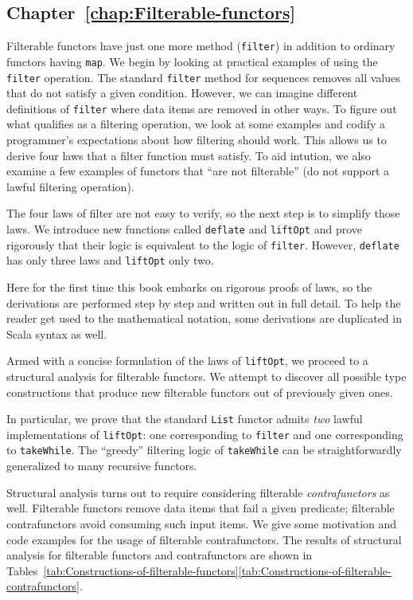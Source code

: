 \subsection{Chapter~\ref{chap:Filterable-functors}}

Filterable functors have just one more method (\lstinline!filter!)
in addition to ordinary functors having \lstinline!map!. We begin
by looking at practical examples of using the \lstinline!filter!
operation. The standard \lstinline!filter! method for sequences removes
all values that do not satisfy a given condition. However, we can
imagine different definitions of \lstinline!filter! where data items
are removed in other ways. To figure out what qualifies as a filtering
operation, we look at some examples and codify a programmer\textsf{'}s expectations
about how filtering should work. This allows us to derive four laws
that a filter function must satisfy. To aid intution, we also examine
a few examples of functors that \textsf{``}are not filterable\textsf{''} (do not support
a lawful filtering operation).

The four laws of filter are not easy to verify, so the next step is
to simplify those laws. We introduce new functions called \lstinline!deflate!
and \lstinline!liftOpt! and prove rigorously that their logic is
equivalent to the logic of \lstinline!filter!. However, \lstinline!deflate!
has only three laws and \lstinline!liftOpt! only two. 

Here for the first time this book embarks on rigorous proofs of laws,
so the derivations are performed step by step and written out in full
detail. To help the reader get used to the mathematical notation,
some derivations are duplicated in Scala syntax as well.

Armed with a concise formulation of the laws of \lstinline!liftOpt!,
we proceed to a structural analysis for filterable functors. We attempt
to discover all possible type constructions that produce new filterable
functors out of previously given ones.

In particular, we prove that the standard \lstinline!List! functor
admits \emph{two} lawful implementations of \lstinline!liftOpt!:
one corresponding to \lstinline!filter! and one corresponding to
\lstinline!takeWhile!. The \textsf{``}greedy\textsf{''} filtering logic of \lstinline!takeWhile!
can be straightforwardly generalized to many recursive functors.

Structural analysis turns out to require considering filterable \emph{contrafunctors}
as well. Filterable functors remove data items that fail a given predicate;
filterable contrafunctors avoid consuming such input items. We give
some motivation and code examples for the usage of filterable contrafunctors.
The results of structural analysis for filterable functors and contrafunctors
are shown in Tables~\ref{tab:Constructions-of-filterable-functors}\textendash \ref{tab:Constructions-of-filterable-contrafunctors}.

